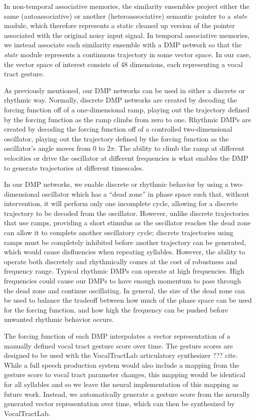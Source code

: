 In non-temporal associative memories,
the similarity ensembles
project either the same (autoassociative)
or another (heteroassociative) semantic pointer
to a \textit{state} module,
which therefore represents
a static cleaned up version of the pointer
associated with
the original noisy input signal.
In temporal associative memories,
we instead associate each similarity ensemble
with a DMP network so that
the \textit{state} module
represents a continuous trajectory
in some vector space.
In our case, the vector space of interest
consists of 48 dimensions,
each representing a vocal tract gesture.

As previously mentioned,
our DMP networks can be used in either
a discrete or rhythmic way.
Normally, discrete DMP networks
are created by decoding the forcing function
off of a one-dimensional ramp,
playing out the trajectory defined by the forcing function
as the ramp climbs from zero to one.
Rhythmic DMPs are created by
decoding the forcing function
off of a controlled two-dimensional oscillator,
playing out the trajectory defined by the forcing function
as the oscillator's angle moves from
$0$ to $2\pi$.
The ability to climb the ramp
at different velocities
or drive the oscillator
at different frequencies
is what enables the DMP
to generate trajectories at different timescales.

In our DMP networks,
we enable discrete or rhythmic behavior
by using a two-dimensional oscillator
which has a ``dead zone'' in
phase space such that,
without intervention,
it will perform only one incomplete cycle,
allowing for a discrete trajectory to
be decoded from the oscillator.
However, unlike discrete trajectories
that use ramps,
providing a short stimulus as the oscillator
reaches the dead zone can allow it
to complete another oscillatory cycle;
discrete trajectories using ramps must
be completely inhibited before another
trajectory can be generated,
which would cause disfluencies
when repeating syllables.
However, the ability to operate
both discretely and rhythmically
comes at the cost of robustness
and frequency range.
Typical rhythmic DMPs
can operate at high frequencies.
High frequencies could cause our DMPs
to have enough momentum to pass through
the dead zone and continue oscillating.
In general, the size of the dead zone
can be used to balance the tradeoff
between how much of the phase space
can be used for the forcing function,
and how high the frequency can be pushed
before unwanted rhythmic behavior occurs.

The forcing function of each DMP
interpolates a vector representation of
a manually defined
vocal tract gesture score over time.
The gesture scores are
designed to be used with the VocalTractLab
articulatory synthesizer ??? cite.
While a full speech production system
would also include a mapping from
the gesture score to
vocal tract parameter changes,
this mapping would be identical
for all syllables
and so we leave the neural implementation
of this mapping as future work.
Instead, we automatically generate
a gesture score from the neurally generated
vector representation over time,
which can then be synthesized
by VocalTractLab.

